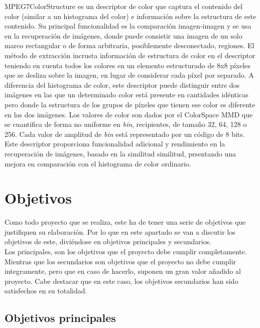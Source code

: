 MPEG7ColorStructure es un descriptor de color que captura el contenido del color (similar a un histograma del color) e información sobre la estructura de este contenido. Su principal funcionalidad es la comparación imagen-imagen y se usa en la recuperación de imágenes, donde puede consistir una imagen de un solo marco rectangular o de forma arbitraria, posiblemente desconectado, regiones. El método de extracción incrusta información de estructura de color en el descriptor teniendo en cuenta todos los colores en un elemento estructurado de 8x8 píxeles que se desliza sobre la imagen, en lugar de considerar cada píxel por separado. A diferencia del histograma de color, este descriptor puede distinguir entre dos imágenes en las que un determinado color está presente en cantidades idénticas pero donde la estructura de los grupos de píxeles que tienen ese color es diferente en las dos imágenes. Los valores de color son dados por el ColorSpace MMD que se cuantifica de forma no uniforme en \textit{bin}, recipientes, de tamaño 32, 64, 128 o 256. Cada valor de amplitud de \textit{bin} está representado por un código de 8 bits. Este descriptor proporciona funcionalidad adicional y rendimiento en la recuperación de imágenes, basado en la similitud similitud, prsentando una mejora en comparación con el histograma de color ordinario.

\section{Objetivos}

Como todo proyecto que se realiza, este ha de tener una serie de objetivos que justifiquen su elaboración. Por lo que en este apartado se van a discutir los objetivos de este, diviéndose en objetivos principales y secundarios.\\

Los principales, son los objetivos que el proyecto debe cumplir completamente. Mientras que los secundarios son objetivos que el proyecto no debe cumplir integramente, pero que en caso de hacerlo, suponen un gran valor añadido al proyecto. Cabe destacar que en este caso, los objetivos secundarios han sido satisfechos en su totalidad.\\

\subsection{Objetivos principales}

